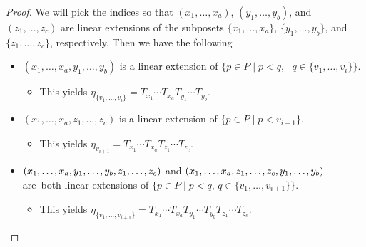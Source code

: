 \documentclass[ALCO,ThmDefs,Unicode,epreuves]{cedram}
\newcommand*{\mk}{\mkern -1mu}
\begin{document}
\begin{proof}
We will pick the indices so that $(x_1,\dots, x_a)$, $(y_1,\dots,y_b)$, and $(z_1,\dots,z_c)$ are linear extensions of the subposets $\{x_1,\dots,x_a\}$, $\{y_1,\dots,y_b\}$, and $\{z_1,\dots,z_c\}$, respectively. Then we have the following
\begin{itemize}
\item $(x_1,\dots,x_a,y_1,\dots,y_b)$ is a linear extension of $\big\{p\in P\;|\; p<q$, \ $q\in\{v_1,\dots, v_i\}\big\}$.
\begin{itemize}
\item This yields $\eta_{\{v_1,\dots,v_i\}}=T_{x_1}\cdots T_{x_a}T_{y_1}\cdots T_{y_b}$.
\end{itemize}
\item $(x_1,\dots,x_a,z_1,\dots,z_c)$ is a linear extension of $\{p\in P \;|\; p<v_{i+1}\}$.
\begin{itemize}
\item This yields $\eta_{v_{i+1}}=T_{x_1}\cdots T_{x_a}T_{z_1}\cdots T_{z_c}$.
\end{itemize}
\item $(x_1,\dots\mk,x_a,y_1,\dots\mk,y_b,z_1,\dots\mk,z_c)$ and 
$(x_1,\dots\mk,x_a,z_1,\dots\mk,z_c,y_1,\dots\mk,y_b)$ are~both linear extensions of $\big\{p\in P \;|\; p<q$, $q\in\{v_1,\dots, v_{i+1}\}\big\}$.
\begin{itemize}
\item This yields $\eta_{\{v_1,\dots,v_{i+1}\}}=T_{x_1}\cdots T_{x_a}T_{y_1}\cdots T_{y_b}T_{z_1}\cdots T_{z_c}$.
\end{itemize}
\end{itemize}


\end{proof}
\end{document}
